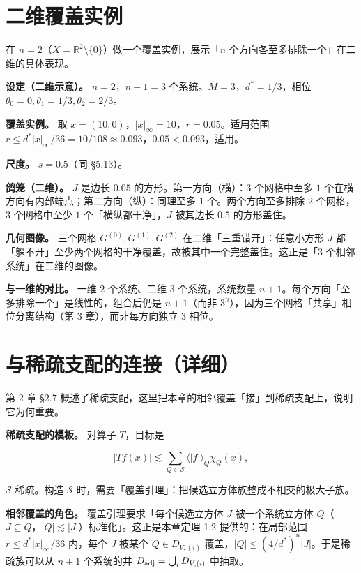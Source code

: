 \documentclass[a4paper,11pt,openany]{ctexbook}
\numberwithin{equation}{chapter}
\numberwithin{figure}{chapter}
\numberwithin{table}{chapter}
\begin{document}
\section{二维覆盖实例}

在 $n=2$（$X=\mathbb R^2\setminus\{0\}$）做一个覆盖实例，展示「$n$ 个方向各至多排除一个」在二维的具体表现。

\textbf{设定（二维示意）。} $n=2$，$n+1=3$ 个系统。$M=3$，$d^*=1/3$，相位 $\theta_0=0,\theta_1=1/3,\theta_2=2/3$。

\textbf{覆盖实例。} 取 $x=(10,0)$，$|x|_\infty=10$，$r=0.05$。适用范围 $r\le d^*|x|_\infty/36=10/108\approx0.093$，$0.05<0.093$，适用。

\textbf{尺度。} $s=0.5$（同 §5.13）。

\textbf{鸽笼（二维）。} $J$ 是边长 $0.05$ 的方形。第一方向（横）：$3$ 个网格中至多 $1$ 个在横方向有内部端点；第二方向（纵）：同理至多 $1$ 个。两个方向至多排除 $2$ 个网格，$3$ 个网格中至少 $1$ 个「横纵都干净」，$J$ 被其边长 $0.5$ 的方形盖住。

\textbf{几何图像。} 三个网格 $G^{(0)},G^{(1)},G^{(2)}$ 在二维「三重错开」：任意小方形 $J$ 都「躲不开」至少两个网格的干净覆盖，故被其中一个完整盖住。这正是「$3$ 个相邻系统」在二维的图像。

\textbf{与一维的对比。} 一维 $2$ 个系统、二维 $3$ 个系统，系统数量 $n+1$。每个方向「至多排除一个」是线性的，组合后仍是 $n+1$（而非 $3^n$），因为三个网格「共享」相位分离结构（第 3 章），而非每方向独立 $3$ 相位。

\section{与稀疏支配的连接（详细）}

第 2 章 §2.7 概述了稀疏支配，这里把本章的相邻覆盖「接」到稀疏支配上，说明它为何重要。

\textbf{稀疏支配的模板。} 对算子 $T$，目标是

$$|Tf(x)|\lesssim\sum_{Q\in\mathcal S}\langle|f|\rangle_Q\chi_Q(x),$$

$\mathcal S$ 稀疏。构造 $\mathcal S$ 时，需要「覆盖引理」：把候选立方体族整成不相交的极大子族。

\textbf{相邻覆盖的角色。} 覆盖引理要求「每个候选立方体 $J$ 被一个系统立方体 $Q$（$J\subseteq Q$，$|Q|\lesssim|J|$）标准化」。这正是本章定理 1.2 提供的：在局部范围 $r\le d^*|x|_\infty/36$ 内，每个 $J$ 被某个 $Q\in D_{V,(i)}$ 覆盖，$|Q|\le(4/d^*)^n|J|$。于是稀疏族可以从 $n+1$ 个系统的并 $D_{\rm adj}=\bigcup_iD_{V,(i)}$ 中抽取。
\end{document}
